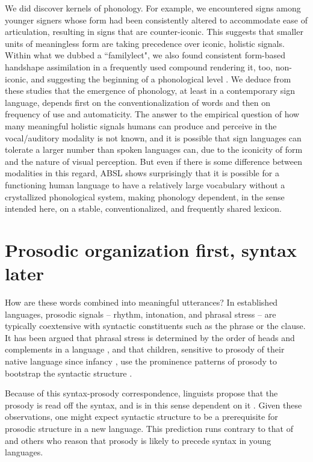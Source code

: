 \documentclass[output=paper]{langsci/langscibook}
\begin{document}
   We did discover kernels of phonology. For example, we encountered signs among younger signers whose form had been consistently altered to accommodate ease of articulation, resulting in signs that are counter-iconic.  This suggests that smaller units of meaningless form are taking precedence over iconic, holistic signals. Within what we dubbed a ``familylect", we also found consistent form-based handshape assimilation in a frequently used compound rendering it, too, non-iconic, and suggesting the beginning of a phonological level \citep{Sandler2011a,Sandler2014nordlyd}.  We deduce from these studies that the emergence of phonology, at least in a contemporary sign language, depends first on the conventionalization   of words and then on frequency of use and automaticity.  The answer to the empirical question of how many meaningful holistic signals humans can produce and perceive in the vocal/auditory modality is not known, and it is possible that sign languages can tolerate a larger number than spoken languages can, due to the iconicity of form and the nature of visual perception.  But even if there is some difference between modalities in this regard, ABSL shows surprisingly that it is possible for a functioning human language to have a relatively large vocabulary without a crystallized phonological system, making phonology dependent, in the sense intended here, on a stable, conventionalized, and frequently shared lexicon.  

\section{Prosodic organization first, syntax later}

   How are these words combined into meaningful utterances?  In established languages, prosodic signals – rhythm, intonation, and phrasal stress -- are typically coextensive with syntactic constituents such as the phrase or the clause.  It has been argued that phrasal stress is determined by the order of heads and complements in a language \citep{Nespor1986}, and that children, sensitive to prosody of their native language since infancy \citep[e.g.,][]{Mehler1994,Juscyk1997}, use the prominence patterns of prosody to bootstrap the syntactic structure \citep[e.g.,][]{Nespor1996}.  

Because of this syntax-prosody correspondence, linguists propose that the prosody is read off the syntax, and is in this sense dependent on it \citep{Selkirk1984,Nespor1986}.  Given these observations, one might expect syntactic structure to be a prerequisite for prosodic structure in a new language.  This prediction runs contrary to that of \citet{Givón1979} and others who reason that prosody is likely to precede syntax in young languages.
\end{document}
